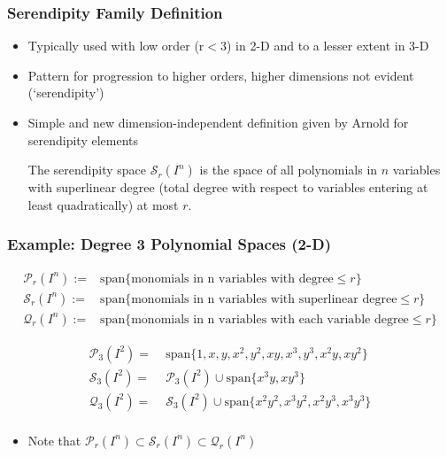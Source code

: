 \documentclass[serif,12pt]{beamer}
\begin{document}
\begin{frame}
\frametitle{Serendipity Family Definition}
	\begin{itemize}
		\item Typically used with low order (r$<$3) in 2-D and to a lesser extent in 3-D
		\item Pattern for progression to higher orders, higher dimensions not evident (`serendipity')
		\item Simple and new dimension-independent definition given by Arnold for serendipity elements
	\begin{definition}
The serendipity space $\mathcal{S}_r(I^n)$ is the space of all polynomials in $n$ variables with superlinear degree (total degree with respect to variables entering at least quadratically) at most $r$.
\end{definition}
\end{itemize}
\end{frame}

\begin{frame}
\frametitle{Example: Degree 3 Polynomial Spaces (2-D)}
	{\footnotesize
		\begin{align*}
		\mathcal{P}_r(I^n) :=& \text{span} \{ \text{monomials in n variables with degree} \leq r \}\\
		\mathcal{S}_r(I^n) :=& \text{span} \{ \text{monomials in n variables with superlinear degree} \leq r \} \\
		\mathcal{Q}_r(I^n) :=& \text{span} \{ \text{monomials in n variables with each variable degree} \leq r \}
		\end{align*}
	}%

	\begin{align*}
	\mathcal{P}_3(I^2) =& \; \text{span} \{ 1,x,y,x^2,y^2,xy,x^3,y^3,x^2y,xy^2 \}\\
	\mathcal{S}_3(I^2) =& \; \mathcal{P}_3(I^2) \cup \text{span} \{ x^3y,xy^3 \} \\
	\mathcal{Q}_3(I^2) =& \; \mathcal{S}_3(I^2) \cup \text{span} \{ x^2y^2,x^3y^2,x^2y^3,x^3y^3 \} \\
	\end{align*}
	
	\begin{itemize}
		\item Note that $\mathcal{P}_r(I^n) \subset \mathcal{S}_r(I^n) \subset \mathcal{Q}_r(I^n)$
	\end{itemize}
\end{frame}
\end{document}
